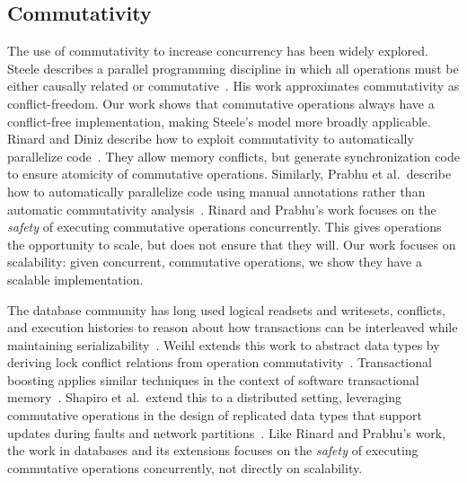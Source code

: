 \subsection{Commutativity}


The use of commutativity to increase concurrency has been widely explored.
%
Steele describes a parallel programming discipline in which all operations must
be either
causally related or commutative~\cite{steele:commutativity}.  His work
approximates commutativity as conflict-freedom.  Our work shows that commutative
operations always have a conflict-free implementation, making Steele's model
more broadly applicable.
%
Rinard and
Diniz describe how to exploit commutativity to automatically parallelize
code~\cite{rinard:commutativity}.  They allow memory conflicts, but generate
synchronization code to ensure atomicity of commutative operations.
%
Similarly, Prabhu et al.\ describe how to automatically parallelize code using
manual annotations rather than automatic commutativity
analysis~\cite{prabhu:cset}.
%
Rinard and Prabhu's work focuses
on the \emph{safety} of executing commutative operations concurrently.  This
gives operations the opportunity to scale, but does not ensure that they will.
Our work focuses on scalability: given concurrent, commutative
operations, we show they have a scalable implementation.

The database community has long used logical readsets and writesets, conflicts,
and execution histories to reason about how transactions can be interleaved
while maintaining serializability~\cite{bernstein:concurrency}.
%
Weihl extends this work to abstract data types by deriving lock conflict
relations from operation commutativity~\cite{weihl:commutativity}.
Transactional boosting applies similar techniques in the context of software
transactional memory~\cite{herlihy:boosting}.
%
Shapiro et al.\ extend this to a distributed setting, leveraging commutative
operations in the design of replicated data types that support updates during
faults and network partitions~\cite{shapiro:conflict-free,shapiro:convergent}.
%
Like Rinard and Prabhu's work, the work in databases and its extensions
focuses on the \emph{safety} of executing commutative operations concurrently,
not directly on scalability.

